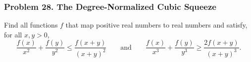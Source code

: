 \subsubsection*{Problem 28. The Degree-Normalized Cubic Squeeze}

\begin{exercisebox}[medium]

Find all functions $f$ that map positive real numbers to real numbers
and satisfy, for all $x,y>0$,
\[
\frac{f(x)}{x^2}+\frac{f(y)}{y^2}
\leq\frac{f(x+y)}{(x+y)^2}
\qquad\text{and}\qquad
\frac{f(x)}{x^3}+\frac{f(y)}{y^3}
\geq\frac{2f(x+y)}{(x+y)^3}.
\]


\end{exercisebox}